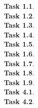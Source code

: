 \documentclass[11pt]{article}
\newcommand{\task}[1]{\clearpage\textbf{Task #1}. \\[0.5em]}
\newcommand{\eeq}{\ensuremath{\cong}}
\newcommand{\code}[2][]{{\sloppy
\ifmmode
    \text{\lstinline[language=sml,style=15150code,#1]`#2`}
\else
    {\lstinline[language=sml,style=15150code,#1]`#2`}%
\fi}}
\newcommand{\codefile}[2][]{}
\begin{document}





\task{1.1}

\task{1.2}

\task{1.3}

\task{1.4}

\task{1.5}

\task{1.6}

\task{1.7}

\task{1.8}

\task{1.9}

\task{4.1}

\task{4.2}
\end{document}
